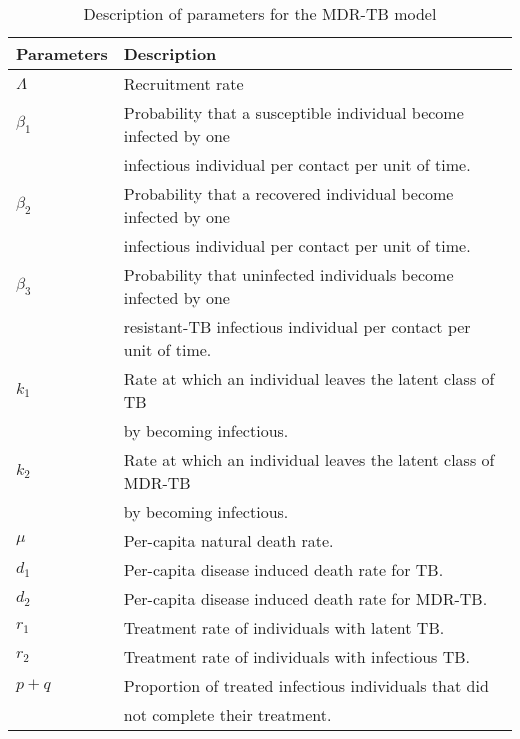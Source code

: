 \begin{table}\label{tbl-ModRes}
	\centering
	\begin{tabular}{ll}
		\toprule
			\textbf{Parameters} & \textbf{Description}
        \\
        \midrule
            $\Lambda$ & Recruitment rate
            \\
            $\beta_1$ & Probability that a susceptible individual become infected by one
            \\
                      & infectious individual per contact per unit of time.
            \\
        	$\beta_2$ & Probability that a recovered individual become infected by one
            \\
                      & infectious individual per contact per unit of time.
            \\
            $\beta_3$ & Probability that uninfected individuals become infected by one
            \\
                      & resistant-TB infectious individual per contact per unit of time.
            \\
     	    $k_1$ & Rate at which an individual leaves the latent class of TB
 			\\
			    & by becoming infectious. 
            \\
     	    $k_2$ & Rate at which an individual leaves the latent class of MDR-TB
 			\\
			    & by becoming infectious.
            \\
			$\mu$ & Per-capita natural death rate.
			\\
     	    $d_1$ & Per-capita disease induced death rate for TB.	 
     	    \\
     	    $d_2$ & Per-capita disease induced death rate for MDR-TB.
     	    \\
     	    $r_1$ & Treatment rate of individuals with latent TB.
     	    \\
     	    $r_2$ & Treatment rate of individuals with infectious TB.
     	    \\
     	    $p+q$ & Proportion of treated infectious individuals that did 
     	    \\
     	        & not complete their treatment.	
			\\
		\bottomrule
	\end{tabular}
	\caption{Description of parameters for the MDR-TB model}
	\label{tbl-ModRes}
\end{table}